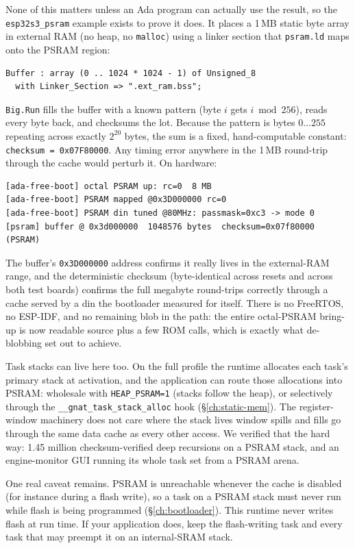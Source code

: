None of this matters unless an Ada program can actually use the result, so the
\texttt{esp32s3\_psram} example exists to prove it does. It places a 1\,MB static byte
array in external RAM (no heap, no \texttt{malloc}) using a linker section that
\texttt{psram.ld} maps onto the PSRAM region:

\begin{lstlisting}
Buffer : array (0 .. 1024 * 1024 - 1) of Unsigned_8
  with Linker_Section => ".ext_ram.bss";
\end{lstlisting}

\texttt{Big.Run} fills the buffer with a known pattern (byte $i$ gets $i \bmod 256$),
reads every byte back, and checksums the lot. Because the pattern is bytes
$0\ldots255$ repeating across exactly $2^{20}$ bytes, the sum is a fixed,
hand-computable constant: \texttt{checksum = 0x07F80000}. Any timing error anywhere in
the 1\,MB round-trip through the cache would perturb it. On hardware:

\begin{lstlisting}[style=sh]
[ada-free-boot] octal PSRAM up: rc=0  8 MB
[ada-free-boot] PSRAM mapped @0x3D000000 rc=0
[ada-free-boot] PSRAM din tuned @80MHz: passmask=0xc3 -> mode 0
[psram] buffer @ 0x3d000000  1048576 bytes  checksum=0x07f80000  (PSRAM)
\end{lstlisting}

The buffer's \texttt{0x3D000000} address confirms it really lives in the external-RAM
range, and the deterministic checksum (byte-identical across resets and across both
test boards) confirms the full megabyte round-trips correctly through a cache served
by a din the bootloader measured for itself. There is no FreeRTOS, no ESP-IDF, and no
remaining blob in the path: the entire octal-PSRAM bring-up is now readable source plus
a few ROM calls, which is exactly what de-blobbing set out to achieve.

Task stacks can live here too. On the full profile the
runtime allocates each task's primary stack at activation, and the application
can route those allocations into PSRAM: wholesale with \texttt{HEAP\_PSRAM=1}
(stacks follow the heap), or selectively through the
\texttt{\_\_gnat\_task\_stack\_alloc} hook (\S\ref{ch:static-mem}). The
register-window machinery does not care where the stack lives \textemdash{}
window spills and fills go through the same data cache as every other access.
We verified that the hard way: 1.45 million checksum-verified deep recursions
on a PSRAM stack, and an engine-monitor GUI running its whole task set from a
PSRAM arena.

One real caveat remains. PSRAM is unreachable whenever the cache is disabled
(for instance during a flash write), so a task on a PSRAM stack must never run
while flash is being programmed (\S\ref{ch:bootloader}). This runtime never
writes flash at run time. If your application does, keep the flash-writing
task \textemdash{} and every task that may preempt it \textemdash{} on an
internal-SRAM stack.
